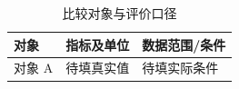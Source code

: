 \begin{table}[htbp]
\centering
\caption{比较对象与评价口径}
\label{tab:comparison}
\begin{tabularx}{\linewidth}{lYY}
\toprule
对象 & 指标及单位 & 数据范围/条件 \\
\midrule
对象 A & 待填真实值 & 待填实际条件 \\
\bottomrule
\end{tabularx}
\end{table}
